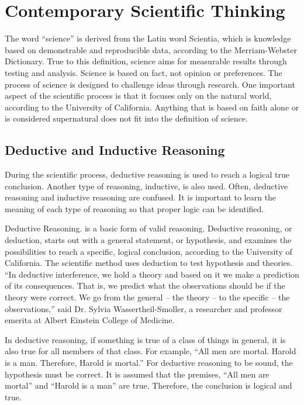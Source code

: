 
\section{Contemporary Scientific Thinking}

The word ``science'' is derived from the Latin word Scientia, which is knowledge based on demonstrable and reproducible data, according to the Merriam-Webster Dictionary. True to this definition, science aims for measurable results through testing and analysis. Science is based on fact, not opinion or preferences. The process of science is designed to challenge ideas through research. One important aspect of the scientific process is that it focuses only on the natural world, according to the University of California. Anything that is based on faith alone or is considered supernatural does not fit into the definition of science.

\subsection{Deductive and Inductive Reasoning}

During the scientific process, deductive reasoning is used to reach a logical true conclusion. Another type of reasoning, inductive, is also used. Often, deductive reasoning and inductive reasoning are confused. It is important to learn the meaning of each type of reasoning so that proper logic can be identified.

Deductive Reasoning. is a basic form of valid reasoning. Deductive reasoning, or deduction, starts out with a general statement, or hypothesis, and examines the possibilities to reach a specific, logical conclusion, according to the University of California. The scientific method uses deduction to test hypothesis and theories. ``In deductive interference, we hold a theory and based on it we make a prediction of its consequences. That is, we predict what the observations should be if the theory were correct. We go from the general – the theory – to the specific – the observations,'' said Dr. Sylvia Wassertheil-Smoller, a researcher and professor emerita at Albert Einstein College of Medicine.

In deductive reasoning, if something is true of a class of things in general, it is also true for all members of that class. For example, ``All men are mortal. Harold is a man. Therefore, Harold is mortal.''  For deductive reasoning to be sound, the hypothesis must be correct. It is assumed that the premises, ``All men are mortal'' and ``Harold is a man'' are true. Therefore, the conclusion is logical and true.


